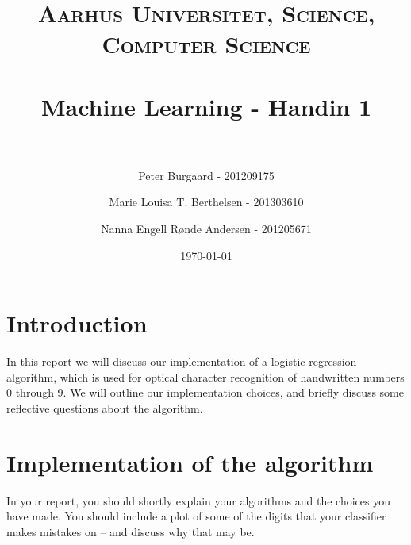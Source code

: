 \documentclass[paper=a4, fontsize=11pt]{scrartcl} %
\title{	
	\normalfont \normalsize 
	\textsc{Aarhus Universitet, Science, Computer Science} \\ [25pt] %
	\horrule{0.5pt} \\[0.4cm] %
	\huge Machine Learning - Handin 1 \\ %
	\horrule{2pt} \\[0.5cm] %
}
\author{Peter Burgaard - 201209175 \and Marie Louisa T. Berthelsen - 201303610 \and Nanna Engell Rønde Andersen - 201205671} %
\date{\normalsize\today} %
\numberwithin{equation}{section} %
\numberwithin{figure}{section} %
\numberwithin{table}{section} %
\begin{document}
	
	\maketitle
	
	\section*{Introduction}
	In this report we will discuss our implementation of a logistic regression algorithm, which is used for optical character recognition of handwritten numbers 0 through 9. We will outline our implementation choices, and briefly discuss some reflective questions about the algorithm.
	
	\section*{Implementation of the algorithm}
	
	In your report, you should shortly explain your algorithms and the choices you have made. You should include a plot of some of the digits that your classifier makes mistakes on -- and discuss why that may be. \\ \\
	
\end{document}
